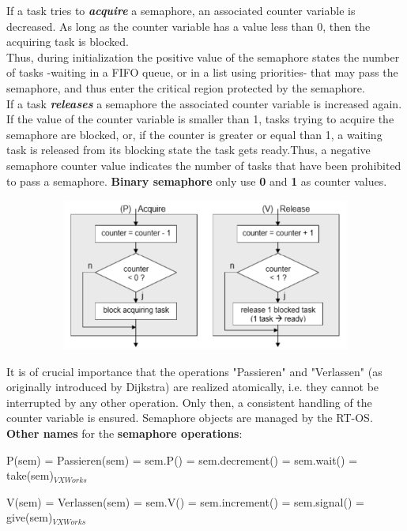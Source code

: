 If a task tries to \textbf{\textit{acquire}} a semaphore, an associated counter variable is decreased. As long as the counter variable has a value less than 0, then the acquiring task is blocked.\\

Thus, during initialization the positive value of the semaphore states the number of tasks -waiting in a FIFO queue, or in a list using priorities- that may pass the semaphore, and thus enter the critical region protected by the semaphore.\\

If a task \textbf{\textit{releases}} a semaphore the associated counter variable is increased again. If the value of the counter variable is smaller than 1, tasks trying to acquire the semaphore are blocked, or, if the counter is greater or equal than 1, a waiting task is released from its blocking state  the task gets ready.Thus, a negative semaphore counter value indicates the number of tasks that have been prohibited to pass a semaphore. \textbf{Binary semaphore} only use \textbf{0} and \textbf{1} as counter values.

 	\begin{figure}[h]
    \centering
    \includegraphics[width=12cm, height=5cm]{Images/image105.png}
    \label{fig:Fig 51}
    \end{figure}

It is of crucial importance that the operations "Passieren" and "Verlassen" (as originally introduced by Dijkstra) are realized atomically, i.e. they cannot be interrupted by any other operation. Only then, a consistent handling of the counter variable is ensured. Semaphore objects are managed by the RT-OS.\\

\textbf{Other names} for the \textbf{semaphore operations}:

P(sem) = Passieren(sem) = sem.P() = sem.decrement() = sem.wait() = take(sem)${}_{VXWorks}$

V(sem) = Verlassen(sem) = sem.V() = sem.increment()  = sem.signal() = give(sem)${}_{VXWorks}$\\


